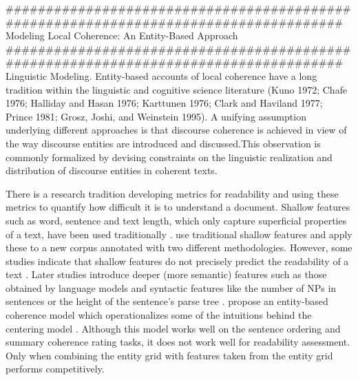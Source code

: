 %
%
%
%
%
%
#####################################################################################
\cite{Barzilay} Modeling Local Coherence: An Entity-Based Approach
#####################################################################################
Linguistic Modeling.
Entity-based accounts of local coherence have a long tradition
within the linguistic and cognitive science literature (Kuno 1972; Chafe 1976; Halliday
and Hasan 1976; Karttunen 1976; Clark and Haviland 1977; Prince 1981; Grosz, Joshi,
and Weinstein 1995). A unifying assumption underlying different approaches is that
discourse coherence is achieved in view of the way discourse entities are introduced
and discussed.This observation is commonly formalized by devising constraints on the
linguistic realization and distribution of discourse entities in coherent texts.



There is a research tradition developing metrics for readability and using these metrics to quantify how difficult it is to understand a
document. 
Shallow features such as word, sentence and text length, which only capture superficial properties of a text, have been used traditionally \cite{flesch48,kincaid75}. 
 use traditional shallow features and apply these to a new corpus annotated with two different methodologies. 
However, some studies indicate that shallow features do not precisely predict the readability of a text \cite{fenglijun09,petersen09}. Later studies introduce deeper (more
semantic) features such as those obtained by language models \cite{siluo01,collins-thompson04} and syntactic features like the number of NPs in sentences or the height of the sentence's parse tree \cite{schwarm05,heilman07}. 
  propose an entity-based coherence model which operationalizes some of the intuitions behind the centering model \cite{grosz95}.  
 Although this model works well on the sentence ordering and summary coherence rating tasks, it does not work well for readability assessment. 
 Only when combining the entity grid with features taken from  the entity grid performs competitively.

